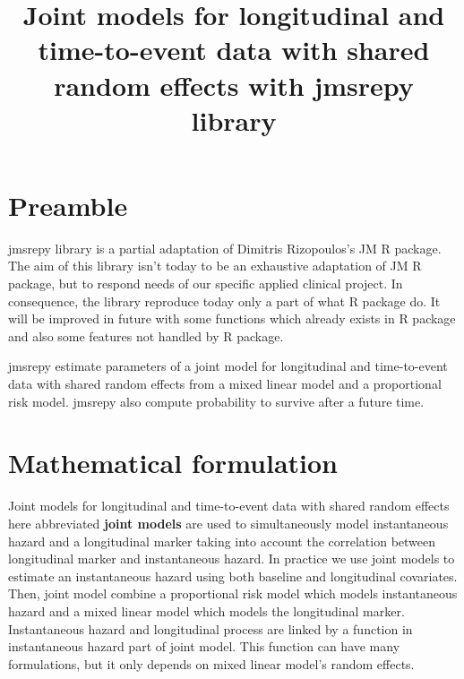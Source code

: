 \documentclass[11pt, oneside]{article}   	%
\title{Joint models for longitudinal and time-to-event data with shared random effects with jmsrepy library}
\date{}							%
\begin{document}
\maketitle









\section{Preamble}\label{preamble}

jmsrepy library is a partial adaptation of Dimitris Rizopoulos's JM R package.
The aim of this library isn't today to be an exhaustive adaptation of JM R package,
but to respond needs of our specific applied clinical project. In consequence, the library reproduce
today only a part of what R package do. It will be improved in future with some functions which already
exists in R package and also some features not handled by R package.

jmsrepy estimate parameters of a joint model for longitudinal and time-to-event data  with shared random effects
from a mixed linear model and a proportional risk model. jmsrepy also compute probability to survive after a
future time.









\section{Mathematical formulation}\label{maths}

Joint models for longitudinal and time-to-event data  with shared random effects here abbreviated
\textbf{joint models} are used to simultaneously model instantaneous hazard and a longitudinal marker
taking into account the correlation between longitudinal marker and instantaneous hazard. In practice
we use joint models to estimate an instantaneous hazard using both baseline and longitudinal covariates.
Then, joint model combine a proportional risk model which models instantaneous hazard and a mixed linear model
which models the longitudinal marker. Instantaneous hazard and longitudinal process are linked by a function in
instantaneous hazard part of joint model. This function can have many formulations, but it only depends on mixed
linear model's random effects.
\end{document}
